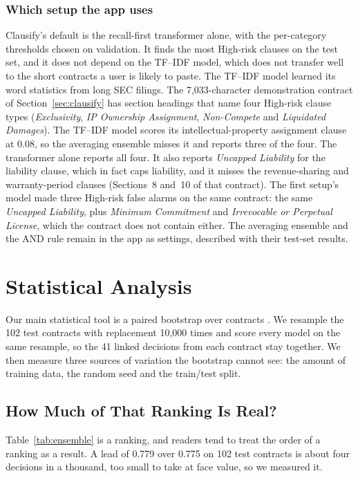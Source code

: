 \subsubsection{Which setup the app uses}
Clausify's default is the recall-first transformer alone, with the per-category thresholds chosen on validation. It finds the most High-risk clauses on the test set, and it does not depend on the TF--IDF model, which does not transfer well to the short contracts a user is likely to paste. The TF--IDF model learned its word statistics from long SEC filings. The 7{,}033-character demonstration contract of Section~\ref{sec:clausify} has section headings that name four High-risk clause types (\emph{Exclusivity}, \emph{IP Ownership Assignment}, \emph{Non-Compete} and \emph{Liquidated Damages}). The TF--IDF model scores its intellectual-property assignment clause at 0.08, so the averaging ensemble misses it and reports three of the four. The transformer alone reports all four. It also reports \emph{Uncapped Liability} for the liability clause, which in fact caps liability, and it misses the revenue-sharing and warranty-period clauses (Sections~8 and~10 of that contract). The first setup's model made three High-risk false alarms on the same contract: the same \emph{Uncapped Liability}, plus \emph{Minimum Commitment} and \emph{Irrevocable or Perpetual License}, which the contract does not contain either. The averaging ensemble and the AND rule remain in the app as settings, described with their test-set results.

\section{Statistical Analysis}
Our main statistical tool is a paired bootstrap over contracts \cite{efron1979bootstrap}. We resample the 102 test contracts with replacement 10{,}000 times and score every model on the same resample, so the 41 linked decisions from each contract stay together. We then measure three sources of variation the bootstrap cannot see: the amount of training data, the random seed and the train/test split.

\subsection{How Much of That Ranking Is Real?}
\label{sec:bootstrap}
Table~\ref{tab:ensemble} is a ranking, and readers tend to treat the order of a ranking as a result. A lead of 0.779 over 0.775 on 102 test contracts is about four decisions in a thousand, too small to take at face value, so we measured it.

